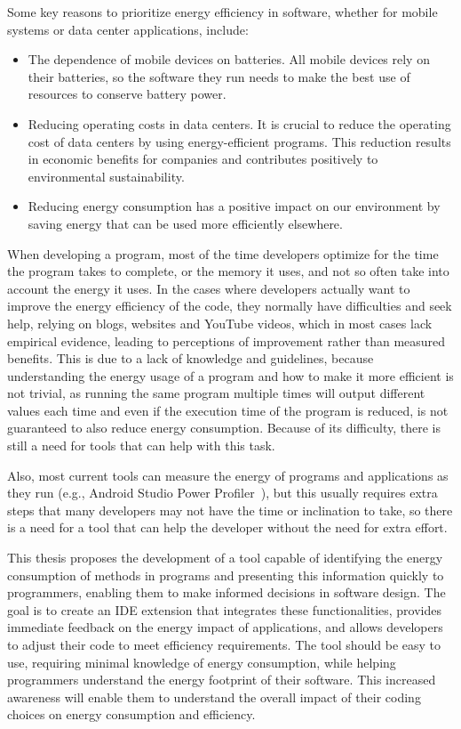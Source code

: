 Some key reasons to prioritize energy efficiency in software, whether for mobile systems or data center applications, include:

\begin{itemize}
  \item The dependence of mobile devices on batteries. All mobile devices rely on their batteries, so the software they run needs to make the best use of resources to conserve battery power.
  \item Reducing operating costs in data centers. It is crucial to reduce the operating cost of data centers by using energy-efficient programs. This reduction results in economic benefits for companies and contributes positively to environmental sustainability. 
  \item Reducing energy consumption has a positive impact on our environment by saving energy that can be used more efficiently elsewhere. 
\end{itemize}

When developing a program, most of the time developers optimize for the time the program takes to complete, or the memory it uses, and not so often take into account the energy it uses. 
In the cases where developers actually want to improve the energy efficiency of the code, they normally have difficulties and seek help, relying on blogs, websites and YouTube videos, which in most cases lack empirical evidence, leading to perceptions of improvement rather than measured benefits\cite{10.1145/3154384}. This is due to a lack of knowledge and guidelines, because understanding the energy usage of a program and how to make it more efficient is not trivial, as running the same program multiple times will output different values each time and even if the execution time of the program is reduced, is not guaranteed to also reduce energy consumption. Because of its difficulty, there is still a need for tools that can help with this task\cite{10.1145/2597073.2597110}. 

Also, most current tools can measure the energy of programs and applications as they run (e.g., Android Studio Power Profiler~\cite{android_power_profiler}), but this usually requires extra steps that many developers may not have the time or inclination to take, so there is a need for a tool that can help the developer without the need for extra effort\cite{10.1145/3154384}.

This thesis proposes the development of a tool capable of identifying the energy consumption of methods in programs and presenting this information quickly to programmers, enabling them to make informed decisions in software design. The goal is to create an IDE extension that integrates these functionalities, provides immediate feedback on the energy impact of applications, and allows developers to adjust their code to meet efficiency requirements. The tool should be easy to use, requiring minimal knowledge of energy consumption, while helping programmers understand the energy footprint of their software. This increased awareness will enable them to understand the overall impact of their coding choices on energy consumption and efficiency.

